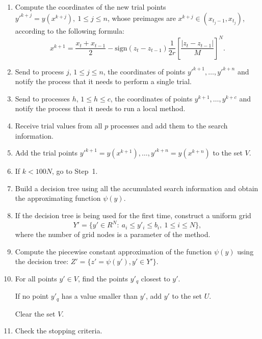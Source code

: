 \documentclass[runningheads]{llncs}
\begin{document}
\begin{enumerate}
	\item Compute the coordinates of the new trial points $y'^{k+j}=y\left(x^{k+j}\right), \ 1\leq j\leq n$, whose preimages are  $x^{k+j}\in\left(x_{t_j-1},x_{t_j}\right)$, according to the following formula:
	\begin{equation}
		\label{agp5_x1}
		x^{k+1}=\frac{x_t+x_{t-1}}{2}-\mathrm{sign}\left(z_t-z_{t-1}\right)\frac{1}{2r}\left[\frac{\left|z_t-z_{t-1}\right|}{M}\right]^N.
	\end{equation}	
	

	
	\item Send to process $j$, $1 \leq j \leq n$, the coordinates of points $y'^{k+1}, \dots, y'^{k+n}$ and notify the process that it needs to perform a single trial.
	
	\item Send to processes $h$, $1 \leq h \leq c$, the coordinates of points $y^{k+1}, \dots, y^{k+c}$ and notify the process that it needs to run a local method.
	
	\item Receive trial values from all $p$ processes and add them to the search information.
	
	\item Add the trial points $y'^{k+1}=y\left(x^{k+1}\right) , \dots, y'^{k+n}=y\left(x^{k+n}\right)$  to the set $V$.
	
	\item If $k < 100N$, go to Step~1.
	
	
	\item Build a decision tree using all the accumulated search information and obtain the approximating function $\psi(y)$.
	
	\item If the decision tree is being used for the first time, construct a uniform grid
	\begin{displaymath} 
		Y'=\{ y'\in R^N:\ a_i\le y'_i \le b_i,\ 1\le i\le N \},
	\end{displaymath} 
	where the number of grid nodes is a parameter of the method.
	
	
	\item Compute the piecewise constant approximation of the function $\psi(y)$ using the decision tree: $Z' = \{ z' = \psi(y'), y' \in Y' \}$.
	
	\item For all points $y' \in V$, find the points $y'_q$ closest to $y'$.
	
	If no point $y'_q$ has a value smaller than $y'$, add $y'$ to the set $U$.
	
	Clear the set $V$.
	
	\item Check the stopping criteria.
	
\end{enumerate}
\end{document}
